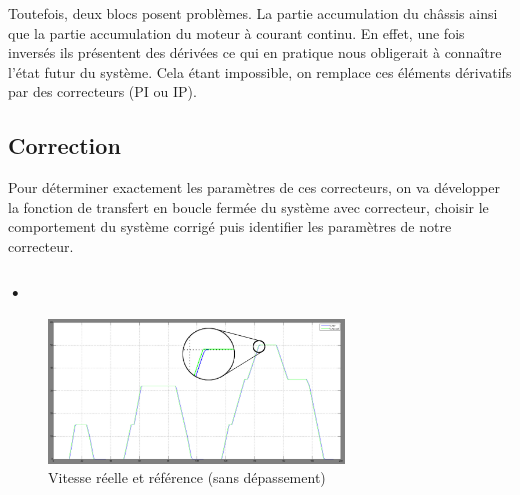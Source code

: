 
Toutefois, deux blocs posent problèmes. La partie accumulation du châssis ainsi que la partie accumulation du moteur à courant continu. En effet, une fois inversés ils présentent des dérivées ce qui en pratique nous obligerait à connaître l'état futur du système. Cela étant impossible, on remplace ces éléments dérivatifs par des correcteurs (PI ou IP).\\

\subsection{Correction}
Pour déterminer exactement les paramètres de ces correcteurs, on va développer la fonction de transfert en boucle fermée du système avec correcteur, choisir le comportement du système corrigé puis identifier les paramètres de notre correcteur.\\
\subsubsection{•}


\begin{figure}[ht]
\begin{center}
	\includegraphics[width=0.7\textwidth]{images/vitesse_zoom}
	\caption{Vitesse réelle et référence (sans dépassement)}\label{img:vitesse}
\end{center}
\end{figure}